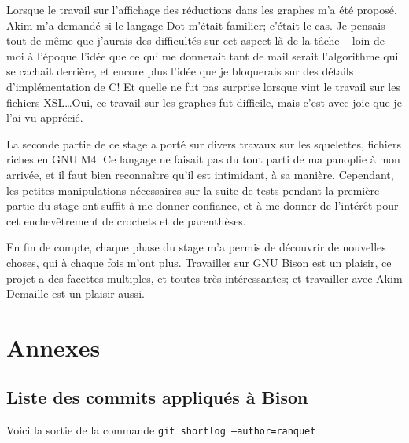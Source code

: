 \documentclass[a4paper,11pt,twoside,final]{article}
\begin{document}
  Lorsque le travail sur l'affichage des réductions dans les graphes m'a été
  proposé, Akim m'a demandé si le langage Dot m'était familier; c'était le cas.
  Je pensais tout de même que j'aurais des difficultés sur cet aspect là de la
  tâche -- loin de moi à l'époque l'idée que ce qui me donnerait tant de mail
  serait l'algorithme qui se cachait derrière, et encore plus l'idée que je
  bloquerais sur des détails d'implémentation de C! Et quelle ne fut pas
  surprise lorsque vint le travail sur les fichiers XSL\ldots Oui, ce travail
  sur les graphes fut difficile, mais c'est avec joie que je l'ai vu apprécié.

  La seconde partie de ce stage a porté sur divers travaux sur les squelettes,
  fichiers riches en GNU M4. Ce langage ne faisait pas du tout parti de ma
  panoplie à mon arrivée, et il faut bien reconnaître qu'il est intimidant, à
  sa manière. Cependant, les petites manipulations nécessaires sur la suite de
  tests pendant la première partie du stage ont suffit à me donner confiance,
  et à me donner de l'intérêt pour cet enchevêtrement de crochets et de
  parenthèses.

  En fin de compte, chaque phase du stage m'a permis de découvrir de nouvelles
  choses, qui à chaque fois m'ont plus. Travailler sur GNU Bison est un
  plaisir, ce projet a des facettes multiples, et toutes très intéressantes; et
  travailler avec Akim Demaille est un plaisir aussi.




  \cleardoublepage
  \section{Annexes}

  \subsection{Liste des commits appliqués à Bison}
  Voici la sortie de la commande \texttt{git shortlog --author=ranquet}
  \begin{adjustwidth}{-2cm}{-2cm}
    
  \end{adjustwidth}

  \cleardoublepage
  \cleardoublepage
\end{document}
